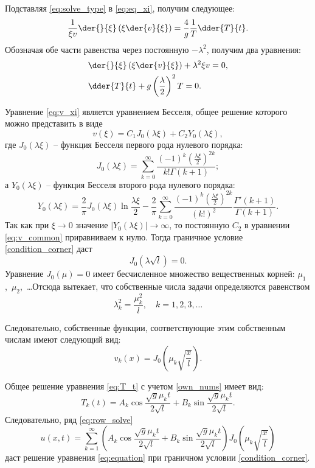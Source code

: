 Подставляя \eqref{eq:solve_type} в \eqref{eq:eq_xi}, получим следующее:
\[
    \frac{1}{\xi v}\der{}{\xi}\left(\xi\der{v}{\xi}\right) = \frac{4}{g}\frac{1}{T}\dder{T}{t}.
\]
Обозначая обе части равенства через постоянную \( -\lambda^2 \), получим два
уравнения:
\begin{align}
    & \der{}{\xi}\left(\xi\der{v}{\xi}\right) + \lambda^2\xi v = 0, \label{eq:v_xi} \\
    & \dder{T}{t} + g\left(\frac{\lambda}{2}\right)^2T = 0. \label{eq:T_t}
\end{align}

Уравнение \eqref{eq:v_xi} является уравнением Бесселя, общее решение которого
можно представить в виде
\begin{equation}
    v(\xi) = C_1J_0(\lambda\xi) + C_2Y_0(\lambda\xi),
    \label{eq:v_common}
\end{equation}
где \( J_0(\lambda\xi) \) -- функция Бесселя первого рода нулевого порядка:
\[
    J_0(\lambda\xi) =
    \sum\limits_{k = 0}^\infty \frac{(-1)^k\left(\frac{\lambda\xi}{2}\right)^{2k}}
    {k!\Gamma(k + 1)};
\]
а \( Y_0(\lambda\xi) \) -- функция Бесселя второго рода нулевого порядка:
\[
    Y_0(\lambda\xi) = \frac{2}{\pi}J_0(\lambda\xi)\ln\frac{\lambda\xi}{2} - \frac{2}{\pi}
    \sum\limits_{k = 0}^\infty \frac{(-1)^k\left(\frac{\lambda\xi}{2}\right)^{2k}}{(k!)^2}
    \frac{\Gamma'(k+1)}{\Gamma(k+1)}.
\]
Так как при \( \xi \to 0 \) значение \( |Y_0(\lambda\xi)| \to \infty \), то постоянную \( C_2 \)
в уравнении \eqref{eq:v_common} приравниваем к нулю. Тогда граничное условие
\eqref{condition_corner} даст
\[
    J_0(\lambda\sqrt{l}) = 0.
\]
Уравнение \( J_0(\mu) = 0 \) имеет бесчисленное множество вещественных корней:
\( \mu_1 \),~\( \mu_2 \),~\ldots Отсюда вытекает, что собственные числа задачи
определяются равенством
\begin{equation}
    \lambda_k^2 = \frac{\mu_k^2}{l}, \hspace{1em} k = 1, 2, 3, \ldots
    \label{own_nums}
\end{equation}

Следовательно, собственные функции, соответствующие этим собственным числам
имеют следующий вид:
\[
    v_k(x) = J_0\left(\mu_k\sqrt{\frac{x}{l}}\right).
\]

Общее решение уравнения \eqref{eq:T_t} с учетом \eqref{own_nums} имеет вид:
\[
    T_k(t) = A_k\cos\frac{\sqrt{g}\mu_kt}{2\sqrt{l}} + B_k\sin\frac{\sqrt{g}\mu_kt}{2\sqrt{l}}.
\]
Следовательно, ряд \eqref{eq:row_solve}
\begin{equation}
    u(x, t) = \sum\limits_{k = 1}^\infty \left(A_k\cos\frac{\sqrt{g}\mu_kt}{2\sqrt{l}} +
    B_k\sin\frac{\sqrt{g}\mu_kt}{2\sqrt{l}}\right)J_0\left(\mu_k\sqrt{\frac{x}{l}}\right)
    \label{eq:row_solve}
\end{equation}
даст решение уравнения \eqref{eq:equation} при граничном условии
\eqref{condition_corner}.

